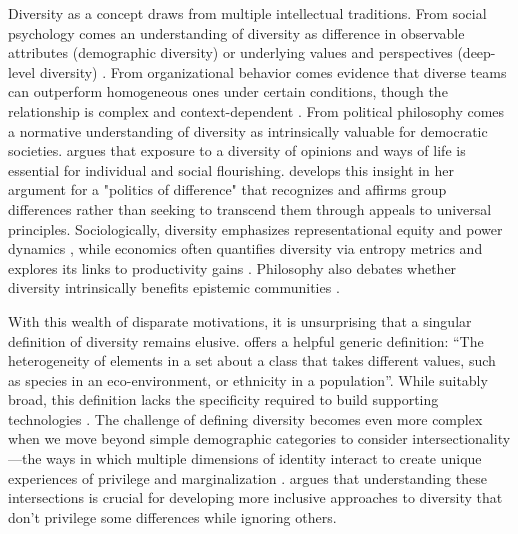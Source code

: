 Diversity as a concept draws from multiple intellectual traditions. From social psychology comes an understanding of diversity as difference in observable attributes (demographic diversity) or underlying values and perspectives (deep-level diversity) \cite{harrison1998time}. From organizational behavior comes evidence that diverse teams can outperform homogeneous ones under certain conditions, though the relationship is complex and context-dependent \cite{williams2013demography}. From political philosophy comes a normative understanding of diversity as intrinsically valuable for democratic societies. \textcite{mill1859liberty} argues that exposure to a diversity of opinions and ways of life is essential for individual and social flourishing. \textcite{young1990justice} develops this insight in her argument for a "politics of difference" that recognizes and affirms group differences rather than seeking to transcend them through appeals to universal principles. Sociologically, diversity emphasizes representational equity and power dynamics \cite{benjamin2019race,noble2018algorithms}, while economics often quantifies diversity via entropy metrics and explores its links to productivity gains \cite{noray2023systemic, page_diversity_2010}. Philosophy also debates whether diversity intrinsically benefits epistemic communities \cite{page_diversity_2010}.

With this wealth of disparate motivations, it is unsurprising that a singular definition of diversity remains elusive. \textcite{page_diversity_2010} offers a helpful generic definition: ``The heterogeneity of elements in a set about a class that takes different values, such as species in an eco-environment, or ethnicity in a population''. While suitably broad, this definition lacks the specificity required to build supporting technologies \cite{hupont2021diverse,page_diversity_2010}. The challenge of defining diversity becomes even more complex when we move beyond simple demographic categories to consider intersectionality—the ways in which multiple dimensions of identity interact to create unique experiences of privilege and marginalization \cite{crenshaw1989demarginalizing}. \textcite{collins2002black} argues that understanding these intersections is crucial for developing more inclusive approaches to diversity that don't privilege some differences while ignoring others.


